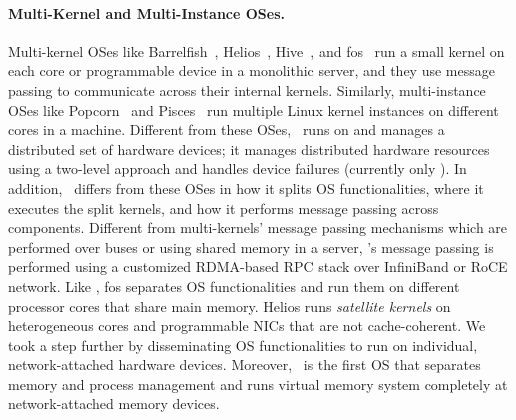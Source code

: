 \documentclass[10pt,times,twocolumn]{z2-article}
\begin{document}
{{{{{{{\paragraph{Multi-Kernel and Multi-Instance OSes.}
Multi-kernel OSes like Barrelfish~\cite{Baumann-SOSP09,Barrelfish-DC}, Helios~\cite{Helios-SOSP}, Hive~\cite{Hive-SOSP}, and fos~\cite{fos-SOCC}
run a small kernel on each core or programmable device in a monolithic server,
and they use message passing to communicate across their internal kernels.
Similarly, multi-instance OSes like Popcorn~\cite{popcorn-eurosys15} and Pisces~\cite{Pisces-hpdc15} run multiple Linux kernel instances
on different cores in a machine. %
Different from these OSes, \lego\ runs on and manages a distributed set of hardware devices;
it manages distributed hardware resources using a two-level approach and handles device failures (currently only \mcomponent).
In addition, \lego\ differs from these OSes in how it splits OS functionalities, where it executes the split kernels,
and how it performs message passing across components.
Different from multi-kernels' message passing mechanisms which are performed over buses or using shared memory in a server, 
\lego's message passing is performed using a customized RDMA-based RPC stack over InfiniBand or RoCE network.
Like \lego, fos separates OS functionalities and run them on different processor cores that share main memory.
Helios runs {\em satellite kernels} on heterogeneous cores and programmable NICs that are not cache-coherent.
We took a step further by disseminating OS functionalities to run on individual, network-attached hardware devices. %
Moreover, \lego\ is the first OS that separates memory and process management and runs virtual memory system completely at network-attached memory devices.



}}}}}}}
\end{document}
